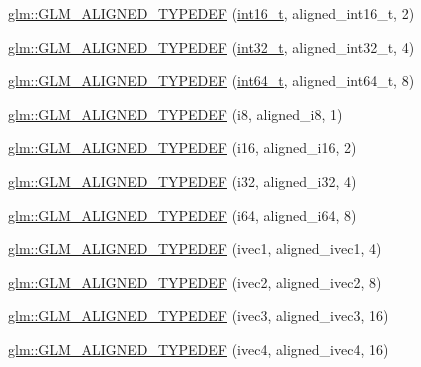 \begin{DoxyCompactItemize}
\item 
\hyperlink{group__gtx__type__aligned_gafd2803d39049dd45a37a63931e25d943}{glm\+::\+G\+L\+M\+\_\+\+A\+L\+I\+G\+N\+E\+D\+\_\+\+T\+Y\+P\+E\+D\+E\+F} (\hyperlink{simddefines_8h_aa5ad9bec438b7cf669efb1ca064e79f5}{int16\+\_\+t}, aligned\+\_\+int16\+\_\+t, 2)
\item 
\hyperlink{group__gtx__type__aligned_gae553b33349d6da832cf0724f1e024094}{glm\+::\+G\+L\+M\+\_\+\+A\+L\+I\+G\+N\+E\+D\+\_\+\+T\+Y\+P\+E\+D\+E\+F} (\hyperlink{simddefines_8h_ab1967d8591af1a4e48c37fd2b0f184d0}{int32\+\_\+t}, aligned\+\_\+int32\+\_\+t, 4)
\item 
\hyperlink{group__gtx__type__aligned_ga16d223a2b3409e812e1d3bd87f0e9e5c}{glm\+::\+G\+L\+M\+\_\+\+A\+L\+I\+G\+N\+E\+D\+\_\+\+T\+Y\+P\+E\+D\+E\+F} (\hyperlink{simddefines_8h_a996e72f71b11a5bb8b3b7b6936b1516d}{int64\+\_\+t}, aligned\+\_\+int64\+\_\+t, 8)
\item 
\hyperlink{group__gtx__type__aligned_ga2de065d2ddfdb366bcd0febca79ae2ad}{glm\+::\+G\+L\+M\+\_\+\+A\+L\+I\+G\+N\+E\+D\+\_\+\+T\+Y\+P\+E\+D\+E\+F} (i8, aligned\+\_\+i8, 1)
\item 
\hyperlink{group__gtx__type__aligned_gabd786bdc20a11c8cb05c92c8212e28d3}{glm\+::\+G\+L\+M\+\_\+\+A\+L\+I\+G\+N\+E\+D\+\_\+\+T\+Y\+P\+E\+D\+E\+F} (i16, aligned\+\_\+i16, 2)
\item 
\hyperlink{group__gtx__type__aligned_gad4aefe56691cdb640c72f0d46d3fb532}{glm\+::\+G\+L\+M\+\_\+\+A\+L\+I\+G\+N\+E\+D\+\_\+\+T\+Y\+P\+E\+D\+E\+F} (i32, aligned\+\_\+i32, 4)
\item 
\hyperlink{group__gtx__type__aligned_ga8fe9745f7de24a8394518152ff9fccdc}{glm\+::\+G\+L\+M\+\_\+\+A\+L\+I\+G\+N\+E\+D\+\_\+\+T\+Y\+P\+E\+D\+E\+F} (i64, aligned\+\_\+i64, 8)
\item 
\hyperlink{group__gtx__type__aligned_gaaad735483450099f7f882d4e3a3569bd}{glm\+::\+G\+L\+M\+\_\+\+A\+L\+I\+G\+N\+E\+D\+\_\+\+T\+Y\+P\+E\+D\+E\+F} (ivec1, aligned\+\_\+ivec1, 4)
\item 
\hyperlink{group__gtx__type__aligned_gac7b6f823802edbd6edbaf70ea25bf068}{glm\+::\+G\+L\+M\+\_\+\+A\+L\+I\+G\+N\+E\+D\+\_\+\+T\+Y\+P\+E\+D\+E\+F} (ivec2, aligned\+\_\+ivec2, 8)
\item 
\hyperlink{group__gtx__type__aligned_ga3e235bcd2b8029613f25b8d40a2d3ef7}{glm\+::\+G\+L\+M\+\_\+\+A\+L\+I\+G\+N\+E\+D\+\_\+\+T\+Y\+P\+E\+D\+E\+F} (ivec3, aligned\+\_\+ivec3, 16)
\item 
\hyperlink{group__gtx__type__aligned_ga50d8a9523968c77f8325b4c9bfbff41e}{glm\+::\+G\+L\+M\+\_\+\+A\+L\+I\+G\+N\+E\+D\+\_\+\+T\+Y\+P\+E\+D\+E\+F} (ivec4, aligned\+\_\+ivec4, 16)

\end{DoxyCompactItemize}
